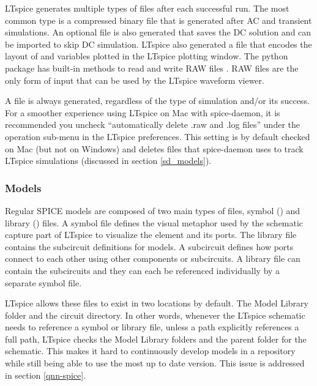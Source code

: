 LTspice generates multiple types of files after each successful run. The most common type is 
a compressed binary  file that is generated after AC and transient simulations. An
optional  file is also generated that saves the DC solution and can be imported
to skip DC simulation. LTspice also generated a  file that encodes the layout of and
variables plotted in the LTspice plotting window. The python package 
has built-in methods to read and write RAW files \cite{pyltspice}. RAW files
are the only form of input that can be used by the LTspice waveform viewer.

A  file is always generated, 
regardless of the type of simulation and/or its success. For a smoother experience using LTspice on Mac with spice-daemon, it is
recommended you uncheck ``automatically delete .raw and .log files'' under the operation sub-menu
in the LTspice preferences. This setting is by default checked on Mac (but not on Windows) and
deletes files that spice-daemon uses to track LTspice simulations (discussed in section \ref{sd_models}).

\subsubsection{Models}

Regular SPICE models are composed of two main types of files, symbol () and library
() files. A symbol file defines the visual metaphor used by the schematic capture
part of LTspice to visualize the element and its ports. The library file contains the subcircuit
definitions for models. A subcircuit defines how ports connect to each other using other components
or subcircuits. A library file can contain the subcircuits and they can each be referenced individually
by a separate symbol file.

LTspice allows these files to exist in two locations by default. The Model Library folder and the circuit directory. In other words, whenever the LTspice schematic needs to reference a symbol or
library file, unless a path explicitly references a full path, LTspice checks the Model Library folders 
and the parent folder for the schematic. This makes it hard to continuously develop models in a repository
while still being able to use the most up to date version. This issue is addressed in section \ref{qnn-spice}.



